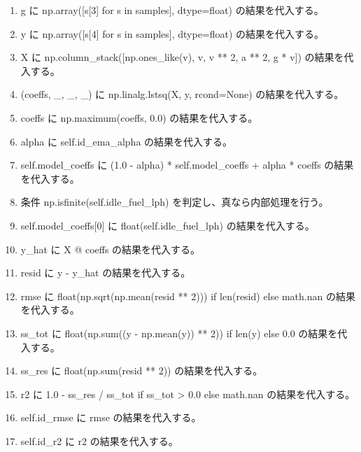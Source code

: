 \documentclass[a4paper,11pt]{article}
\begin{document}
\begin{enumerate}[leftmargin=1.8em]
\item g に np.array([s[3] for s in samples], dtype=float) の結果を代入する。
\item y に np.array([s[4] for s in samples], dtype=float) の結果を代入する。
\item X に np.column\_stack([np.ones\_like(v), v, v ** 2, a ** 2, g * v]) の結果を代入する。
\item (coeffs, \_, \_, \_) に np.linalg.lstsq(X, y, rcond=None) の結果を代入する。
\item coeffs に np.maximum(coeffs, 0.0) の結果を代入する。
\item alpha に self.id\_ema\_alpha の結果を代入する。
\item self.model\_coeffs に (1.0 - alpha) * self.model\_coeffs + alpha * coeffs の結果を代入する。
\item 条件 np.isfinite(self.idle\_fuel\_lph) を判定し、真なら内部処理を行う。
\item   self.model\_coeffs[0] に float(self.idle\_fuel\_lph) の結果を代入する。
\item y\_hat に X @ coeffs の結果を代入する。
\item resid に y - y\_hat の結果を代入する。
\item rmse に float(np.sqrt(np.mean(resid ** 2))) if len(resid) else math.nan の結果を代入する。
\item ss\_tot に float(np.sum((y - np.mean(y)) ** 2)) if len(y) else 0.0 の結果を代入する。
\item ss\_res に float(np.sum(resid ** 2)) の結果を代入する。
\item r2 に 1.0 - ss\_res / ss\_tot if ss\_tot > 0.0 else math.nan の結果を代入する。
\item self.id\_rmse に rmse の結果を代入する。
\item self.id\_r2 に r2 の結果を代入する。
            \end{enumerate}
\end{document}
